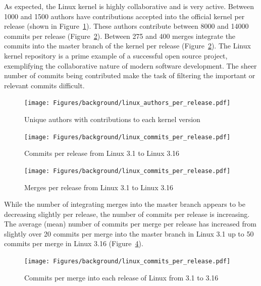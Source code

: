 As expected, the Linux kernel is highly collaborative and is very
active. Between 1000 and 1500 authors have contributions accepted into
the official kernel per release (shown in
Figure~\ref{fig:linux_authors_per_release}).
These authors contribute between 8000 and 14000 commits per release
(Figure~\ref{fig:linux_commits_per_release}).
Between 275 and 400 merges integrate the commits into the master branch
of the kernel per release (Figure~\ref{fig:linux_commits_per_release}).
The Linux kernel repository is a prime example of a successful open
source project, exemplifying the collaborative nature of modern software
development.
The sheer number of commits being contributed make the task
of filtering the important or relevant commits difficult.

\begin{figure}[htpb]
  \centering
  \texttt{[image: Figures/background/linux\_authors\_per\_release.pdf]}
  \caption{Unique authors with contributions to each kernel version}
  \label{fig:linux_authors_per_release}
\end{figure}

\begin{figure}[htpb]
  \centering
  \texttt{[image: Figures/background/linux\_commits\_per\_release.pdf]}
  \caption{Commits per release from Linux 3.1 to Linux 3.16}
  \label{fig:linux_commits_per_release}
\end{figure}

\begin{figure}[htpb]
  \centering
  \texttt{[image: Figures/background/linux\_commits\_per\_release.pdf]}
  \caption{Merges per release from Linux 3.1 to Linux 3.16}
  \label{fig:linux_merges_per_release}
\end{figure}

While the number of integrating merges into the master branch appears to
be decreasing slightly per release, the number of commits per release is
increasing.
The average (mean) number of commits per merge per release has
increased from slightly over 20 commits per merge into the master branch
in Linux 3.1 up to 50 commits per merge in Linux 3.16
(Figure~\ref{fig:linux_commits_per_merge_per_release}).

\begin{figure}[htpb]
  \centering
  \texttt{[image: Figures/background/linux\_commits\_per\_release.pdf]}
  \caption{Commits per merge into each release of Linux from 3.1 to 3.16}
  \label{fig:linux_commits_per_merge_per_release}
\end{figure}

